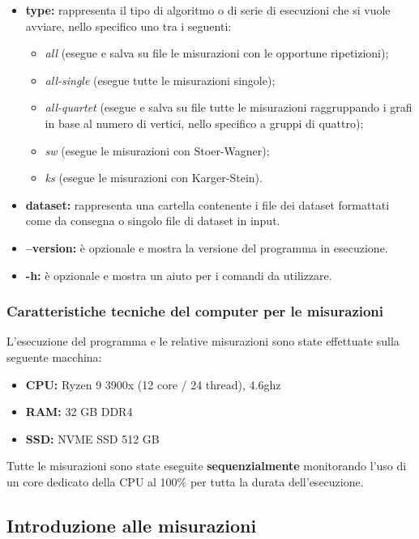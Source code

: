 \begin{itemize}
    \item \textbf{type:} rappresenta il tipo di algoritmo o di serie di esecuzioni che si vuole avviare, nello specifico uno tra i seguenti: 
    \begin{itemize}
        \item \textit{all} (esegue e salva su file le misurazioni con le opportune ripetizioni);
        \item \textit{all-single} (esegue tutte le misurazioni singole);
        \item \textit{all-quartet} (esegue e salva su file tutte le misurazioni raggruppando i grafi in base al numero di vertici, nello specifico a gruppi di quattro);
        \item \textit{sw} (esegue le misurazioni con Stoer-Wagner);
        \item \textit{ks} (esegue le misurazioni con Karger-Stein).   
    \end{itemize} 
    \item \textbf{dataset:} rappresenta una cartella contenente i file dei dataset formattati come da consegna o singolo file di dataset in input. 
    \item \textbf{--version:} è opzionale e mostra la versione del programma in esecuzione. 
    \item \textbf{-h:} è opzionale e mostra un aiuto per i comandi da utilizzare. 
\end{itemize}

\subsubsection{Caratteristiche tecniche del computer per le misurazioni} 

L'esecuzione del programma e le relative misurazioni sono state effettuate sulla seguente macchina:
\begin{itemize}
    \item \textbf{CPU:} Ryzen 9 3900x (12 core / 24 thread), 4.6ghz
    \item \textbf{RAM:} 32 GB DDR4 
    \item \textbf{SSD:} NVME SSD 512 GB
\end{itemize}

\noindent Tutte le misurazioni sono state eseguite \textbf{sequenzialmente} monitorando l'uso di un core dedicato della CPU al 100\% per tutta la durata dell'esecuzione.


\subsection{Introduzione alle misurazioni} 

